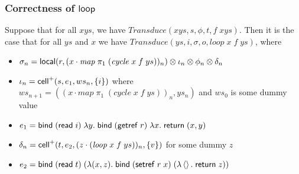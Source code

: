 \subsubsection{Correctness of $\mathsf{loop}$}

\begin{lemma}
  Suppose that for all $xys$, we have $\mathit{Transduce}(xys, s,
  \phi, t, f\;xys)$. Then it is the case that for all $ys$ and $x$ we
  have $\mathit{Transduce}(ys, i, \sigma, o, \mathit{loop}\;x\;f\;ys)$, where

  \begin{itemize}
  \item $\sigma_n = \mathsf{local}({r}, {(x \cdot \mathit{map}\;\pi_1\;(\mathit{cycle}\;x\;f\;ys))_n}) \otimes
                      \iota_n \otimes \phi_n \otimes \delta_n$ 
  \item $\iota_n = \mathsf{cell}^{+}({s}, {e_1}, {ws_n}, {\{{i}\}})$ where $ws_{n+1} = ((x \cdot \mathit{map}\;\pi_1\;(\mathit{cycle}\;x\;f\;ys))_n, ys_n)$ and $ws_0$ is some dummy value\\
  \item $e_1 = \mathsf{bind}\; (\mathsf{read}\; i)\; \lambda y.\;\mathsf{bind}\; (\mathsf{getref}\; r)\; \lambda x.\;\mathsf{return}\; (x,y)$ \\
  \item $\delta_n = \mathsf{cell}^{+}({t}, {e_2}, {(z\cdot (\mathit{loop}\;x\;f\;ys))_n}, {\{{v}\}})$ for some dummy $z$ \\ 
  \item $e_2 = \mathsf{bind}\; (\mathsf{read}\; t)\; (\lambda (x,z).\;
               \mathsf{bind}\; (\mathsf{setref}\; r\;x)\; (\lambda \left<\right>.\;\mathsf{return}\; z))$ \\
  \end{itemize}
\end{lemma}

